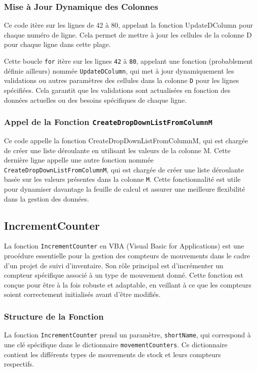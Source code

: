 \documentclass[a4paper, oneside, 12pt, final]{extreport}
\begin{document}
\subsubsection{Mise à Jour Dynamique des Colonnes}

Ce code itère sur les lignes de 42 à 80, appelant la fonction UpdateDColumn pour chaque numéro de ligne. Cela permet de mettre à jour les cellules de la colonne D pour chaque ligne dans cette plage.

Cette boucle \texttt{for} itère sur les lignes \texttt{42} à \texttt{80}, appelant une fonction (probablement définie ailleurs) nommée \texttt{UpdateDColumn}, qui met à jour dynamiquement les validations ou autres paramètres des cellules dans la colonne \texttt{D} pour les lignes spécifiées. Cela garantit que les validations sont actualisées en fonction des données actuelles ou des besoins spécifiques de chaque ligne.

\subsubsection{Appel de la Fonction \texttt{CreateDropDownListFromColumnM}}

Ce code appelle la fonction CreateDropDownListFromColumnM, qui est chargée de créer une liste déroulante en utilisant les valeurs de la colonne M.
Cette dernière ligne appelle une autre fonction nommée \texttt{CreateDropDownListFromColumnM}, qui est chargée de créer une liste déroulante basée sur les valeurs présentes dans la colonne \texttt{M}. Cette fonctionnalité est utile pour dynamiser davantage la feuille de calcul et assurer une meilleure flexibilité dans la gestion des données.


\subsection{IncrementCounter}
La fonction \texttt{IncrementCounter} en VBA (Visual Basic for Applications) est une procédure essentielle pour la gestion des compteurs de mouvements dans le cadre d'un projet de suivi d'inventaire. Son rôle principal est d'incrémenter un compteur spécifique associé à un type de mouvement donné. Cette fonction est conçue pour être à la fois robuste et adaptable, en veillant à ce que les compteurs soient correctement initialisés avant d'être modifiés.

\subsubsection{Structure de la Fonction}
La fonction \texttt{IncrementCounter} prend un paramètre, \texttt{shortName}, qui correspond à une clé spécifique dans le dictionnaire \texttt{movementCounters}. Ce dictionnaire contient les différents types de mouvements de stock et leurs compteurs respectifs.
\end{document}
